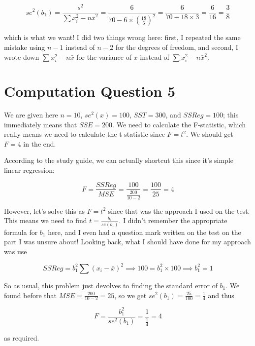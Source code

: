 \documentclass[12pt, letterpaper, parskip = full]{article}
\begin{document}
    \[ se^2(b_1) = \frac{s^2}{\sum x_i^2 - n \bar{x}^2} = \frac{6}{70 - 6 \times \left(\frac{18}{6}\right)^2} = \frac{6}{70 - 18 \times 3} = \frac{6}{16} = \frac{3}{8}   \]

    which is what we want! I did two things wrong here: first, I repeated the same mistake using \(n-1\) instead of \(n-2\) for the degrees of freedom, and second, I wrote down \(\sum x_i^2 - n \bar{x}\) for the variance of \(x\) instead of \(\sum x_i^2 - n \bar{x}^2\). 

    \section{Computation Question 5}

    We are given here \(n = 10\), \(se^2(x) = 100\), \(SST = 300\), and \(SSReg = 100\); this immediately means that \(SSE = 200\). We need to calculate the F-statistic, which really means we need to calculate the t-statistic since \(F = t^2\). We should get \(F = 4\) in the end. 

    According to the study guide, we can actually shortcut this since it's simple linear regression: 

    \[ F = \frac{SSReg}{MSE} = \frac{100}{\frac{200}{10 - 2}} = \frac{100}{25} = 4  \]

    However, let's solve this as \(F = t^2\) since that was the approach I used on the test. This means we need to find \(t = \frac{b_1}{se(b_1)}\). I didn't remember the appropriate formula for \(b_1\) here, and I even had a question mark written on the test on the part I was unsure about! Looking back, what I should have done for my approach was use

    \[ SSReg = b_1^2 \sum (x_i - \bar{x})^2 \implies 100 = b_1^2 \times 100 \implies b_1^2 = 1   \]

    So as usual, this problem just devolves to finding the standard error of \(b_1\). We found before that \(MSE = \frac{200}{10 - 2} = 25\), so we get \(se^2(b_1) = \frac{25}{100} = \frac{1}{4}\) and thus 

    \[ F = \frac{b_1^2}{se^2(b_1)} = \frac{1}{\frac{1}{4}} = 4  \]

    as required.
\end{document}

